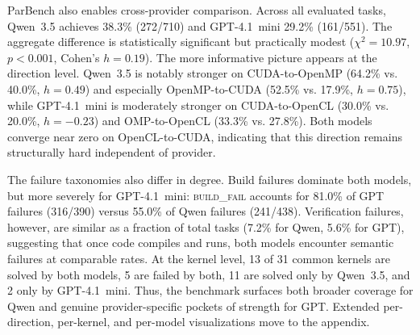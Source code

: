 ParBench also enables cross-provider comparison. Across all evaluated tasks, Qwen~3.5 achieves 38.3\% (272/710) and GPT-4.1~mini 29.2\% (161/551). The aggregate difference is statistically significant but practically modest ($\chi^2 = 10.97$, $p < 0.001$, Cohen's $h = 0.19$). The more informative picture appears at the direction level. Qwen~3.5 is notably stronger on CUDA-to-OpenMP (64.2\% vs. 40.0\%, $h = 0.49$) and especially OpenMP-to-CUDA (52.5\% vs. 17.9\%, $h = 0.75$), while GPT-4.1~mini is moderately stronger on CUDA-to-OpenCL (30.0\% vs. 20.0\%, $h = -0.23$) and OMP-to-OpenCL (33.3\% vs. 27.8\%). Both models converge near zero on OpenCL-to-CUDA, indicating that this direction remains structurally hard independent of provider.

The failure taxonomies also differ in degree. Build failures dominate both models, but more severely for GPT-4.1~mini: \textsc{build\_fail} accounts for 81.0\% of GPT failures (316/390) versus 55.0\% of Qwen failures (241/438). Verification failures, however, are similar as a fraction of total tasks (7.2\% for Qwen, 5.6\% for GPT), suggesting that once code compiles and runs, both models encounter semantic failures at comparable rates. At the kernel level, 13 of 31 common kernels are solved by both models, 5 are failed by both, 11 are solved only by Qwen~3.5, and 2 only by GPT-4.1~mini. Thus, the benchmark surfaces both broader coverage for Qwen and genuine provider-specific pockets of strength for GPT. Extended per-direction, per-kernel, and per-model visualizations move to the appendix.
